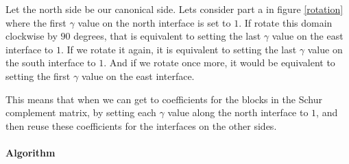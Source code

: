 \documentclass[12pt]{article}
\begin{document}
Let the north side be our canonical side. Lets consider part a in figure \ref{rotation} where the
first $\gamma$ value on the north interface is set to $1$. If rotate this domain clockwise by $90$
degrees, that is equivalent to setting the last $\gamma$ value on the east interface to $1$. If we
rotate it again, it is equivalent to setting the last $\gamma$ value on the south interface to
$1$. And if we rotate once more, it would be equivalent to setting the first $\gamma$ value on the
east interface. 

This means that when we can get to coefficients for the blocks in the Schur complement matrix, by
setting each $\gamma$ value along the north interface to $1$, and then reuse these coefficients for
the interfaces on the other sides.



\paragraph{Algorithm}
\end{document}
